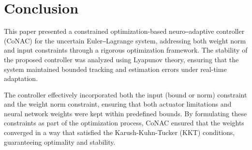 \documentclass[lettersize,journal]{IEEEtran}
\begin{document}


\section{Conclusion}\label{sec:conclusion}

This paper presented a constrained optimization-based neuro‒adaptive controller (CoNAC) for the uncertain Euler‒Lagrange system, addressing both weight norm and input constraints through a rigorous optimization framework. The stability of the proposed controller was analyzed using Lyapunov theory, ensuring that the system maintained bounded tracking and estimation errors under real-time adaptation.

The controller effectively incorporated both the input (bound or norm) constraint and the weight norm constraint, ensuring that both actuator limitations and neural network weights were kept within predefined bounds. By formulating these constraints as part of the optimization process, CoNAC ensured that the weights converged in a way that satisfied the Karush-Kuhn-Tucker (KKT) conditions, guaranteeing optimality and stability.
\end{document}
